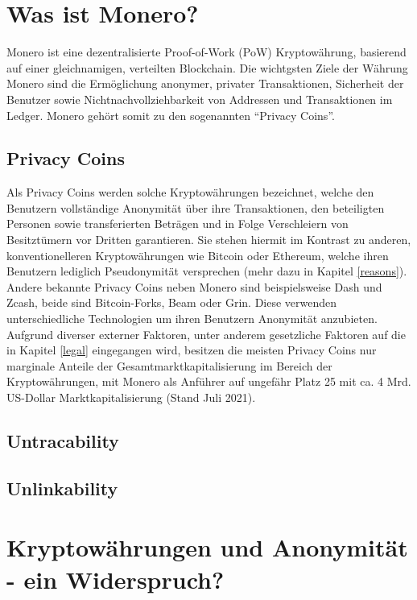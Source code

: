 \chapter{Was ist Monero?}
Monero ist eine dezentralisierte Proof-of-Work (PoW) Kryptowährung, basierend auf einer gleichnamigen, verteilten Blockchain\cite[vgl. Abstract]{Koe2020}.
Die wichtgsten Ziele der Währung Monero sind die Ermöglichung anonymer, privater Transaktionen, Sicherheit der Benutzer sowie Nichtnachvollziehbarkeit von Addressen und Transaktionen im Ledger.
Monero gehört somit zu den sogenannten ``Privacy Coins''.

\section{Privacy Coins}
Als Privacy Coins werden solche Kryptowährungen bezeichnet, welche den Benutzern vollständige Anonymität über ihre Transaktionen, den beteiligten Personen sowie transferierten Beträgen
und in Folge Verschleiern von Besitztümern vor Dritten garantieren.
Sie stehen hiermit im Kontrast zu anderen, konventionelleren Kryptowährungen wie Bitcoin oder Ethereum, welche ihren Benutzern lediglich Pseudonymität versprechen\cite{Vermaak2021} (mehr dazu in Kapitel \ref{reasons}).
Andere bekannte Privacy Coins neben Monero sind beispielsweise Dash und Zcash, beide sind Bitcoin-Forks, Beam oder Grin. Diese verwenden unterschiedliche Technologien um ihren Benutzern Anonymität anzubieten.\\
Aufgrund diverser externer Faktoren, unter anderem gesetzliche Faktoren auf die in Kapitel \ref{legal} eingegangen wird, besitzen die meisten Privacy Coins nur marginale Anteile der Gesamtmarktkapitalisierung im Bereich der Kryptowährungen, 
mit Monero als Anführer auf ungefähr Platz 25 mit ca. 4 Mrd. US-Dollar Marktkapitalisierung (Stand Juli 2021)\cite{CoinMarketCap2021}.

\section{Untracability}


\section{Unlinkability}

\chapter{Kryptowährungen und Anonymität - ein Widerspruch?}

